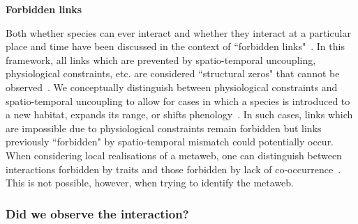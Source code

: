 \documentclass[12pt]{article}
\begin{document}
\begin{spacing}{2.0}


          \textbf{Forbidden links}

            Both whether species can ever interact and whether they interact at a particular place and time have been discussed in the context of ``forbidden links"~\citep{Jordano2016}. In this framework, all links which are prevented by spatio-temporal uncoupling, physiological constraints, etc. are considered ``structural zeros" that cannot be observed~\citep{Jordano1987,Jordano2016}. We conceptually distinguish between physiological constraints and spatio-temporal uncoupling to allow for cases in which a species is introduced to a new habitat, expands its range, or shifts phenology~\citep{Gravel2013}. In such cases, links which are impossible due to physiological constraints remain forbidden but links previously ``forbidden" by spatio-temporal mismatch could potentially occur. When considering local realisations of a metaweb, one can distinguish between interactions forbidden by traits and those forbidden by lack of co-occurrence~\citep{Gravel2018}. This is not possible, however, when trying to identify the metaweb.


        \subsubsection*{Did we observe the interaction?} 


\end{spacing}
\end{document}
